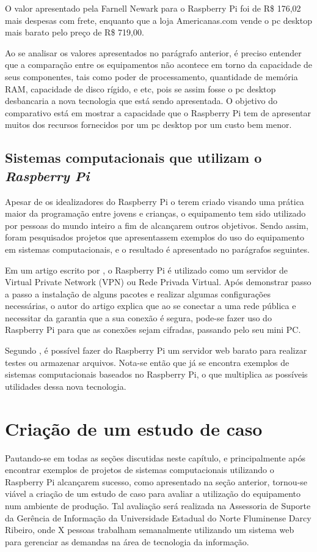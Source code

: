 O valor apresentado pela Farnell Newark para o Raspberry Pi foi de R\$ 176,02 mais despesas com frete, enquanto que a loja Americanas.com vende o pc desktop mais barato pelo preço de R\$ 719,00.

Ao se analisar os valores apresentados no parágrafo anterior, é preciso entender que a comparação entre os equipamentos não acontece em torno da capacidade de seus componentes, tais como poder de processamento, quantidade de memória RAM, capacidade de disco rígido, e etc, pois se assim fosse o pc desktop desbancaria a nova tecnologia que está sendo apresentada. O objetivo do comparativo está em mostrar a capacidade que o Raspberry Pi tem de apresentar muitos dos recursos fornecidos por um pc desktop por um custo bem menor.

\subsection{Sistemas computacionais que utilizam o \textit{Raspberry Pi}}

Apesar de os idealizadores do Raspberry Pi o terem criado visando uma prática maior da programação entre jovens e crianças, o equipamento tem sido utilizado por pessoas do mundo inteiro a fim de alcançarem outros objetivos. Sendo assim, foram pesquisados projetos que apresentassem exemplos do uso do equipamento em sistemas computacionais, e o resultado é apresentado no parágrafos seguintes.

Em um artigo escrito por , o Raspberry Pi é utilizado como um servidor de Virtual Private Network (VPN) ou Rede Privada Virtual. Após demonstrar passo a passo a instalação de alguns pacotes e realizar algumas configurações necessárias, o autor do artigo explica que ao se conectar a uma rede pública e necessitar da garantia que a sua conexão é segura, pode-se fazer uso do Raspberry Pi para que as conexões sejam cifradas, passando pelo seu mini PC.

Segundo , é possível fazer do Raspberry Pi um servidor web barato para realizar testes ou armazenar arquivos.
Nota-se então que já se encontra exemplos de sistemas computacionais baseados no Raspberry Pi, o que multiplica as possíveis utilidades dessa nova tecnologia.

\section{Criação de um estudo de caso}

Pautando-se em todas as seções discutidas neste capítulo, e principalmente após encontrar exemplos de projetos de sistemas computacionais utilizando o Raspberry Pi alcançarem sucesso, como apresentado na seção anterior, tornou-se viável a criação de um estudo de caso para avaliar a utilização do equipamento num ambiente de produção. Tal avaliação será realizada na Assessoria de Suporte da Gerência de Informação da Universidade Estadual do Norte Fluminense Darcy Ribeiro, onde X pessoas trabalham semanalmente utilizando um sistema web para gerenciar as demandas na área de tecnologia da informação.

